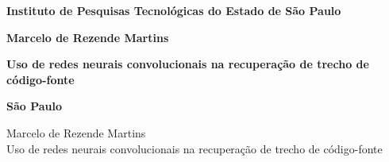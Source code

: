 \documentclass[12pt,twoside,a4paper]{book} %
\begin{document}
\frontmatter 
\fancyhead[RO]{{\footnotesize\rightmark}\hspace{2em}\thepage}
\setcounter{tocdepth}{2}
\fancyhead[LE]{\thepage\hspace{2em}\footnotesize{\leftmark}}
\fancyhead[RE,LO]{}
\fancyhead[RO]{{\footnotesize\rightmark}\hspace{2em}\thepage}

\onehalfspacing  %

\thispagestyle{empty}
\begin{center}
    \large{\textbf{Instituto de Pesquisas Tecnológicas do Estado de São Paulo}}\\
    
    \vspace*{4cm}
    
    
    
    
    \large{\textbf{Marcelo de Rezende Martins}}
    
    \vspace*{6cm}
    
    \textbf{\large{Uso de redes neurais convolucionais na recuperação de trecho de código-fonte}}\\
    
    
    
   \vspace*{10cm}
   
    \large{\textbf{São Paulo}} \\
    \large{\textbf{\the\year}}
\end{center}

%
%
%
\newpage
\thispagestyle{empty}
    \begin{center}
        Marcelo de Rezende Martins\\
        \vspace*{2.3 cm}
        Uso de redes neurais convolucionais na recuperação de trecho de código-fonte\\
        \vspace*{2 cm}
    \end{center}
\end{document}
